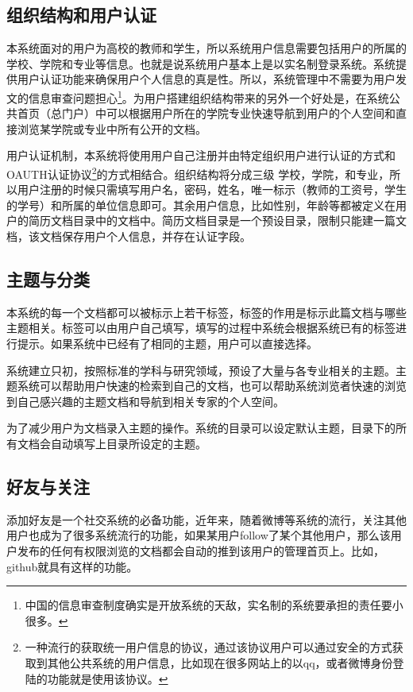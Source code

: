 \subsection{组织结构和用户认证}
\label{sec:auth}

本系统面对的用户为高校的教师和学生，所以系统用户信息需要包括用户的所属的学校、学院和专业等信息。也就是说系统用户基本上是以实名制登录系统。系统提供用户认证功能来确保用户个人信息的真是性。所以，系统管理中不需要为用户发文的信息审查问题担心\footnote{中国的信息审查制度确实是开放系统的天敌，实名制的系统要承担的责任要小很多。}。为用户搭建组织结构带来的另外一个好处是，在系统公共首页（总门户）中可以根据用户所在的学院专业快速导航到用户的个人空间和直接浏览某学院或专业中所有公开的文档。

用户认证机制，本系统将使用用户自己注册并由特定组织用户进行认证的方式和OAUTH认证协议\footnote{一种流行的获取统一用户信息的协议，通过该协议用户可以通过安全的方式获取到其他公共系统的用户信息，比如现在很多网站上的以qq，或者微博身份登陆的功能就是使用该协议。}的方式相结合。组织结构将分成三级 学校，学院，和专业，所以用户注册的时候只需填写用户名，密码，姓名，唯一标示（教师的工资号，学生的学号）和所属的单位信息即可。其余用户信息，比如性别，年龄等都被定义在用户的简历文档目录中的文档中。简历文档目录是一个预设目录，限制只能建一篇文档，该文档保存用户个人信息，并存在认证字段。

\subsection{主题与分类}
\label{sec:topic}

本系统的每一个文档都可以被标示上若干标签，标签的作用是标示此篇文档与哪些主题相关。标签可以由用户自己填写，填写的过程中系统会根据系统已有的标签进行提示。如果系统中已经有了相同的主题，用户可以直接选择。

系统建立只初，按照标准的学科与研究领域，预设了大量与各专业相关的主题。主题系统可以帮助用户快速的检索到自己的文档，也可以帮助系统浏览者快速的浏览到自己感兴趣的主题文档和导航到相关专家的个人空间。

为了减少用户为文档录入主题的操作。系统的目录可以设定默认主题，目录下的所有文档会自动填写上目录所设定的主题。

\subsection{好友与关注}
\label{sec:friend}

添加好友是一个社交系统的必备功能，近年来，随着微博等系统的流行，关注其他用户也成为了很多系统流行的功能，如果某用户follow了某个其他用户，那么该用户发布的任何有权限浏览的文档都会自动的推到该用户的管理首页上。比如，github就具有这样的功能。

